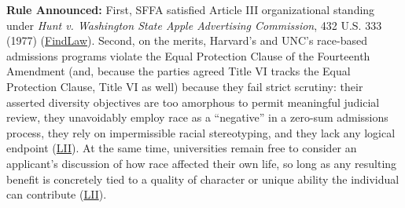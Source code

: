 \documentclass[12pt]{article}
\begin{document}
\textbf{Rule Announced:} First, SFFA satisfied Article III organizational standing under \textit{Hunt v. Washington State Apple Advertising Commission}, 432 U.S. 333 (1977) (\href{https://caselaw.findlaw.com/court/us-supreme-court/20-1199.html}{FindLaw}). Second, on the merits, Harvard's and UNC's race-based admissions programs violate the Equal Protection Clause of the Fourteenth Amendment (and, because the parties agreed Title VI tracks the Equal Protection Clause, Title VI as well) because they fail strict scrutiny: their asserted diversity objectives are too amorphous to permit meaningful judicial review, they unavoidably employ race as a ``negative'' in a zero-sum admissions process, they rely on impermissible racial stereotyping, and they lack any logical endpoint (\href{https://www.law.cornell.edu/supremecourt/text/20-1199}{LII}). At the same time, universities remain free to consider an applicant's discussion of how race affected their own life, so long as any resulting benefit is concretely tied to a quality of character or unique ability the individual can contribute (\href{https://www.law.cornell.edu/supremecourt/text/20-1199}{LII}).
\end{document}
